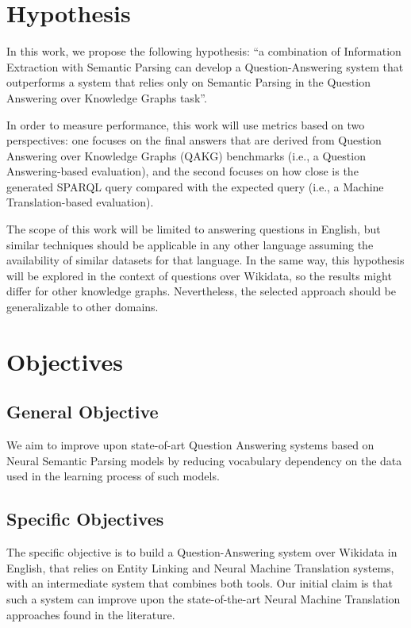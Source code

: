 \section{Hypothesis}
In this work, we propose the following hypothesis: “a combination of Information 
Extraction with Semantic Parsing can develop a Question-Answering system that outperforms 
a system that relies only on Semantic Parsing in the Question Answering over Knowledge 
Graphs task”.

In order to measure performance, this work will use metrics based on two perspectives: 
one focuses on the final answers that are derived from Question Answering over Knowledge 
Graphs (QAKG) benchmarks (i.e., a Question Answering-based evaluation), and the second 
focuses on how close is the generated SPARQL query compared with the expected query (i.e., 
a Machine Translation-based evaluation).

The scope of this work will be limited to answering questions in English, but similar 
techniques should be applicable in any other language assuming the availability of similar 
datasets for that language. In the same way, this hypothesis will be explored in the context of 
questions over Wikidata, so the results might differ for other knowledge graphs. Nevertheless, 
the selected approach should be generalizable to other domains. 

\section{Objectives}
\subsection*{General Objective}
We aim to improve upon state-of-art Question Answering systems 
based on Neural Semantic Parsing models by reducing vocabulary dependency on the 
data used in the learning process of such models.
\subsection*{Specific Objectives}
The specific objective is to build a Question-Answering system over Wikidata in English, 
that relies on Entity Linking and Neural Machine Translation systems, with an intermediate 
system that combines both tools. Our initial claim is that such a system can improve upon 
the state-of-the-art Neural Machine Translation approaches found in the literature.  


